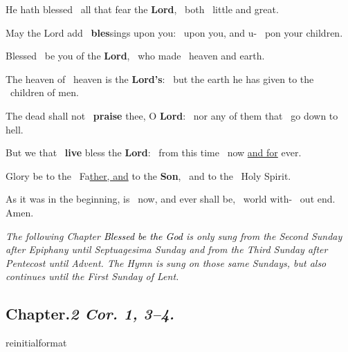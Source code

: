\documentclass[12pt]{article} %
\def\noinitial{%
\gresetfirstlineaboveinitial{\textcolor{benred8}{\small \textsc{\textbf{}}}}{\textcolor{benred8}{\small \textsc{\textbf{}}}}
\setspaceafterinitial{0pt plus 0em minus 0em}%
\setspacebeforeinitial{0pt plus 0em minus 0em}%
\relax %
}
\newcommand{\myaboveinitial}[1]{%
    \expandafter\renewcommand\csname greinitialformat\endcsname[1]{%
        \fontsize{43}{43}\selectfont ##1
    }
    \gresetfirstlineaboveinitial{\textcolor{benred8}{\raisebox{6.0mm}{\small \textsc{\textbf{#1}}}}}{}
}
\newenvironment{psalmtext}{\leftskip 0.25in}{\vspace{1 mm}}
\newenvironment{rubric}{\vspace{1 mm}\color{benred8} \itshape \leftskip 0in \setlength{\parindent}{0.25in}}{\vspace{1 mm}}
\def\pipe{\textcolor{benred8}{\textdoublepipe}}
\let\oldgresixstar\gresixstar
\renewcommand{\gresixstar}{\textcolor{benred8}{\oldgresixstar}}
\def\capitulumSpace{\hspace{20 mm}}
\begin{document}
\begin{pages}
\begin{Rightside}
\begin{psalmtext}
He hath blessed \pipe\ all that fear the \textbf{Lord}, \gresixstar\ both \pipe\ little and great.

May the Lord add \pipe\ \textbf{bles}sings upon you: \gresixstar\ upon you, and u- \pipe\ pon your children.

Blessed \pipe\ be you of the \textbf{Lord}, \gresixstar\ who made \pipe\ heaven and earth.

The heaven of \pipe\ heaven is the \textbf{Lord's}: \gresixstar\ but the earth he has given to the \pipe\ children of men.

The dead shall not \pipe\ \textbf{praise} thee, O \textbf{Lord}: \gresixstar\ nor any of them that \pipe\ go down to hell.

But we that \pipe\ \textbf{live} bless the \textbf{Lord}: \gresixstar\ from this time \pipe\ now \uline{and for} ever.

Glory be to the \pipe\ Fa\uline{ther, and} to the \textbf{Son}, \gresixstar\ and to the \pipe\ Holy Spirit.

As it was in the beginning, is \pipe\ now, and ever shall be, \gresixstar\ world with- \pipe\ out end. Amen.

\end{psalmtext}

\pend\pstart

{\noinitial
{}
}

\pend\pstart

\begin{rubric}
The following Chapter \emph{\textcolor{black}{Blessed be the God}} is only sung from the Second Sunday after Epiphany until Septuagesima Sunday and from the Third Sunday after Pentecost until Advent. The Hymn is sung on those same Sundays, but also continues until the First Sunday of Lent.

\end{rubric}

\pend\pstart


\subsection*{Chapter.\capitulumSpace \emph{2 Cor. 1, 3--4.}}

\label{SundayChapter}

\pend\pstart

\myaboveinitial{}


\end{Rightside}
\end{pages}
\end{document}
